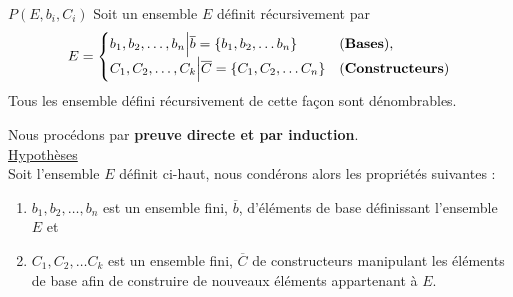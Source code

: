 \documentclass[16pt]{report}
\begin{document}
\begin{multicols*}{2}
            \begin{prop}{$P(E, b_i, C_i) $}{}
                 Soit un ensemble $E$ définit récursivement par  
                  \begin{equation*}
                  E = \begin{cases}
                      b_1, b_2, \dots, b_n \Big| \overline{b} = \{b_1, b_2, \dots b_n \} & \text{(\textbf{Bases})},
                        \\
                      C_1, C_2, \dots, C_k \Big| \overline{C} = \{C_1, C_2, \dots C_n \} & \text{(\textbf{Constructeurs})}                    
                        \end{cases}
                \end{equation*}
                Tous les ensemble défini récursivement de cette façon sont dénombrables. 
            \end{prop}

            \begin{Preuve}{}{}
            Nous procédons par \textbf{preuve directe et par induction}. 
            \vspace{1em}\\
            \underline{Hypothèses}
            \vspace{1em}\\
            Soit l'ensemble $E$ définit ci-haut, nous condérons alors les propriétés suivantes : 
            \begin{enumerate}
                \item $b_1, b_2, \dots, b_n$ est un ensemble fini, $\overline{b}$, d'éléments de base définissant 
            l'ensemble $E$ et 
                \item $C_1, C_2, \dots C_k$ est un ensemble fini, $\overline{C}$ de 
            constructeurs manipulant les éléments de base afin de construire de nouveaux éléments 
            appartenant à $E$. 
            \end{enumerate}


\end{Preuve}
\end{multicols*}
\end{document}
